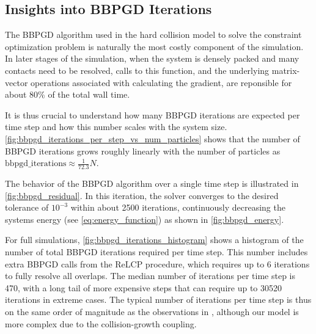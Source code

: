 \documentclass[conference]{IEEEtran}
\begin{document}
\newpage


\subsection{Insights into BBPGD Iterations}

The BBPGD algorithm used in the hard collision model to solve the constraint optimization problem is naturally the most costly component of the simulation. In later stages of the simulation, when the system is densely packed and many contacts need to be resolved, calls to this function, and the underlying matrix-vector operations associated with calculating the gradient, are reponsible for about 80\% of the total wall time.

It is thus crucial to understand how many BBPGD iterations are expected per time step and how this number scales with the system size. \autoref{fig:bbpgd_iterations_per_step_vs_num_particles} shows that the number of BBPGD iterations grows roughly linearly with the number of particles as $\text{bbpgd\_iterations} \approx  \frac{1}{72.3} N$.

The behavior of the BBPGD algorithm over a single time step is illustrated in \autoref{fig:bbpgd_residual}. In this iteration, the solver converges to the desired tolerance of $10^{-3}$ within about 2500 iterations, continuously decreasing the systems energy (see \autoref{eq:energy_function}) as shown in \autoref{fig:bbpgd_energy}.

For full simulations, \autoref{fig:bbpgd_iterations_histogram} shows a histogram of the number of total BBPGD iterations required per time step. This number includes extra BBPGD calls from the ReLCP procedure, which requires up to 6 iterations to fully resolve all overlaps\cite{Weady2024SM}. The median number of iterations per time step is 470, with a long tail of more expensive steps that can require up to 30520 iterations in extreme cases. The typical number of iterations per time step is thus on the same order of magnitude as the observations in \cite{Yan2019}, although our model is more complex due to the collision-growth coupling.
\end{document}
